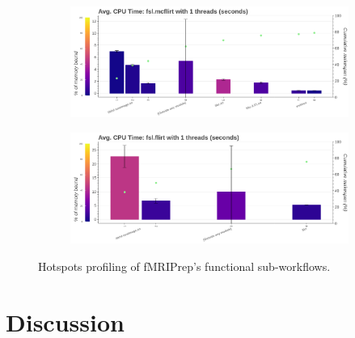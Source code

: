 \documentclass[conference]{IEEEtran}
\begin{document}
\begin{figure}[ht!]
	\centering
	\begin{subfigure}[t]{0.49\textwidth}
		\caption{}
		\label{subfig:hotspots-fsl-mcflirt}
		\includegraphics[width=\textwidth]{figures/hotspots-1thread-fsl-mcflirt.png}
	\end{subfigure}
	\hfill
	\begin{subfigure}[t]{0.49\textwidth}
		\caption{}
		\label{subfig:hotspots-fsl-flirt}
		\includegraphics[width=\textwidth]{figures/hotspots-1thread-fsl-flirt.png}
	\end{subfigure}
																																																
	\caption{Hotspots profiling of fMRIPrep's functional sub-workflows.}
	\label{fig:hotspots-fmriprep-func-subworkflow}
\end{figure}

\section{Discussion}

\end{document}

